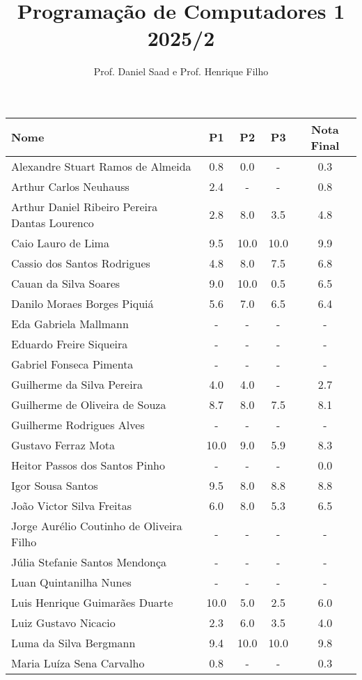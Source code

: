 \documentclass{article}
\title{ Programação de Computadores 1 2025/2}
\date{}
\author{ Prof. Daniel Saad e Prof. Henrique Filho}
\begin{document}
 \maketitle
    \begin{longtable}{|l|c|c|c|c|}
    \hline
Nome & P1 & P2 & P3 & Nota Final\\\hline \endhead   
Alexandre Stuart Ramos de Almeida & 0.8 & 0.0 & - & 0.3\\\hline
Arthur Carlos Neuhauss & 2.4 & - & - & 0.8\\\hline
Arthur Daniel Ribeiro Pereira Dantas Lourenco & 2.8 & 8.0 & 3.5 & 4.8\\\hline
Caio Lauro de Lima & 9.5 & 10.0 & 10.0 & 9.9\\\hline
Cassio dos Santos Rodrigues & 4.8 & 8.0 & 7.5 & 6.8\\\hline
Cauan da Silva Soares & 9.0 & 10.0 & 0.5 & 6.5\\\hline
Danilo Moraes Borges Piquiá & 5.6 & 7.0 & 6.5 & 6.4\\\hline
Eda Gabriela Mallmann & - & - & - & -\\\hline
Eduardo Freire Siqueira & - & - & - & -\\\hline
Gabriel Fonseca Pimenta & - & - & - & -\\\hline
Guilherme da Silva Pereira & 4.0 & 4.0 & - & 2.7\\\hline
Guilherme de Oliveira de Souza & 8.7 & 8.0 & 7.5 & 8.1\\\hline
Guilherme Rodrigues Alves & - & - & - & -\\\hline
Gustavo Ferraz Mota & 10.0 & 9.0 & 5.9 & 8.3\\\hline
Heitor Passos dos Santos Pinho & - & - & - & 0.0\\\hline
Igor Sousa Santos & 9.5 & 8.0 & 8.8 & 8.8\\\hline
João Victor Silva Freitas & 6.0 & 8.0 & 5.3 & 6.5\\\hline
Jorge Aurélio Coutinho de Oliveira Filho & - & - & - & -\\\hline
Júlia Stefanie Santos Mendonça & - & - & - & -\\\hline
Luan Quintanilha Nunes & - & - & - & -\\\hline
Luis Henrique Guimarães Duarte & 10.0 & 5.0 & 2.5 & 6.0\\\hline
Luiz Gustavo Nicacio & 2.3 & 6.0 & 3.5 & 4.0\\\hline
Luma da Silva Bergmann & 9.4 & 10.0 & 10.0 & 9.8\\\hline
Maria Luíza Sena Carvalho & 0.8 & - & - & 0.3\\\hline

\end{longtable}
\end{document}
